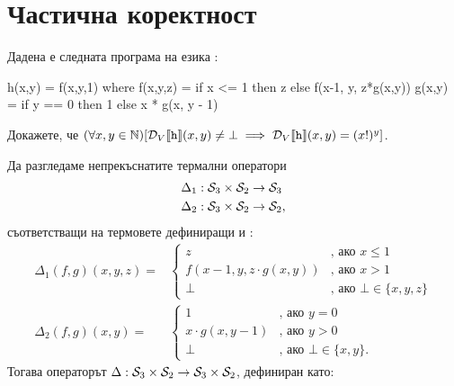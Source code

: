 \section{Частична коректност}

\begin{problem}
  Дадена е следната програма на езика \REC:
  
  \begin{haskellcode}
h(x,y) = f(x,y,1) where
  f(x,y,z) = if x <= 1 then z 
               else f(x-1, y, z*g(x,y))
  g(x,y) = if y == 0 then 1 
             else x * g(x, y - 1)
  \end{haskellcode}
  
  Докажете, че $(\forall x,y\in\Nat)[\D_V\val{\vv{h}}(x,y) \neq \bot \implies \D_V\val{\vv{h}}(x,y) = (x!)^y]$.
\end{problem}
\begin{solution}
  Да разгледаме непрекъснатите термални оператори 
  \begin{align*}
    & \Delta_1:\S_3\times\S_2 \to \S_3\\
    & \Delta_2:\S_3\times\S_2 \to \S_2,
  \end{align*}
  съответстващи на термовете дефиниращи  и :
  \begin{align*}
    \Delta_1(f,g)(x,y,z) = &
    \begin{cases}
      z & \text{, ако } x \leq 1\\
      f(x-1,y,z\cdot g(x,y)) &  \text{, ако } x > 1\\
      \bot & \text{, ако }\bot \in \{x,y,z\}
    \end{cases}
    \\
    \Delta_2(f,g)(x,y) = &
    \begin{cases}
      1 & \text{, ако } y = 0\\
      x \cdot g(x,y-1) & \text{, ако }y > 0\\
      \bot & \text{, ако } \bot \in \{x,y\}.
    \end{cases}
  \end{align*}
  Тогава операторът $\Delta:\S_3\times\S_2 \to \S_3\times\S_2$, дефиниран като:
\end{solution}
